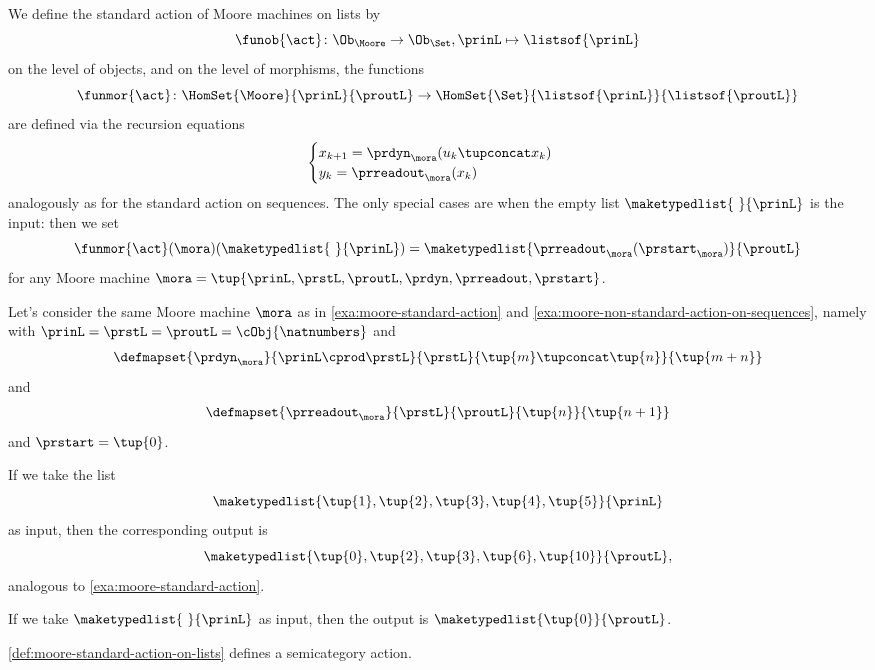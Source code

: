 \begin{definition}
\label{def:moore-standard-action-on-lists}
We define the standard action of Moore machines on lists by 
\begin{equation}
\funob{\act} \colon \Ob_{\Moore} \to \Ob_{\Set}, \prinL \mapsto \listsof{\prinL}
\end{equation}
on the level of objects, and on the level of morphisms, the functions 
\begin{equation}
\funmor{\act} \colon  \HomSet{\Moore}{\prinL}{\proutL} \to \HomSet{\Set}{ \listsof{\prinL}}{\listsof{\proutL}}
\end{equation}
are defined via the recursion equations
\begin{equation}
    \begin{cases}
        x_{k+1} = \prdyn_\mora(u_k \tupconcat x_k) \\
        y_{k}   = \prreadout_\mora(x_{k})
    \end{cases}
\end{equation}
analogously as for the standard action on sequences. The only special cases are when the empty list $\maketypedlist{\ }{\prinL}$ is the input: then we set 
$$
\funmor{\act}(\mora)(\maketypedlist{\ }{\prinL}) = \maketypedlist{ \prreadout_\mora(\prstart_\mora) }{\proutL}
$$
for any Moore machine $\mora = \tup{\prinL,\prstL,\proutL,\prdyn,\prreadout,\prstart}$.
\end{definition}

\begin{example}
\label{exa:moore-non-standard-action-on-lists}
Let's consider the same Moore machine $\mora$ as in \cref{exa:moore-standard-action} and \cref{exa:moore-non-standard-action-on-sequences}, namely with $\prinL = \prstL = \proutL = \cObj{\natnumbers}$
and 
\begin{equation}
\defmapset{
\prdyn_\mora
}{
\prinL \cprod \prstL
}{
\prstL
}{
\tup{m} \tupconcat \tup{n}
}{
\tup{m + n}
}
\end{equation}
and 
\begin{equation}
\defmapset{
\prreadout_\mora
}{
\prstL
}{
\proutL
}{
\tup{n}
}{
\tup{n+1}
}
\end{equation}
and $\prstart = \tup{0}$. 

If we take the list 
$$
\maketypedlist{\tup{1}, \tup{2}, \tup{3}, \tup{4}, \tup{5}}{\prinL}
$$
as input, then the corresponding output is 
$$
\maketypedlist{\tup{0}, \tup{2}, \tup{3}, \tup{6}, \tup{10}}{\proutL},
$$
analogous to \cref{exa:moore-standard-action}. 

If we take $\maketypedlist{\ }{\prinL}$ as input, then the output is $\maketypedlist{\tup{0}}{\proutL}$.
\end{example}



\begin{lemma}
\cref{def:moore-standard-action-on-lists} defines a semicategory action. 
\end{lemma}





